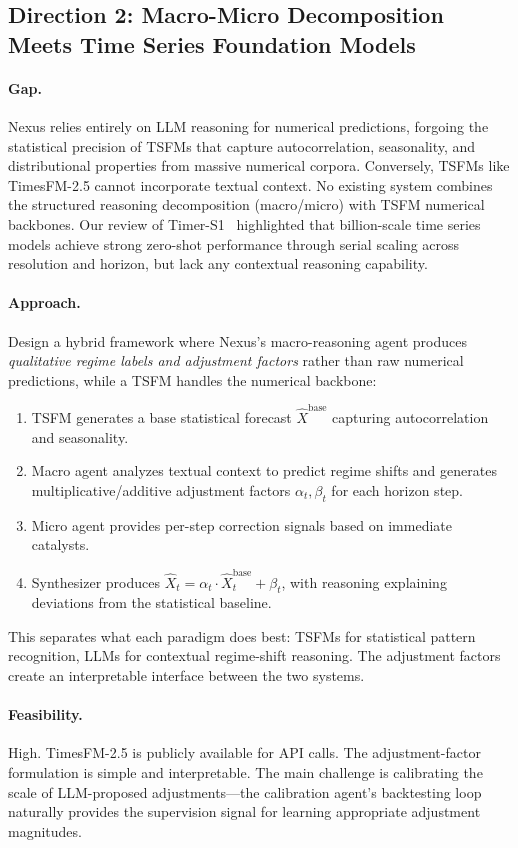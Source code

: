 \documentclass[11pt,a4paper]{article}
\begin{document}
\subsection{Direction 2: Macro-Micro Decomposition Meets Time Series Foundation Models}

\paragraph{Gap.} Nexus relies entirely on LLM reasoning for numerical predictions, forgoing the statistical precision of TSFMs that capture autocorrelation, seasonality, and distributional properties from massive numerical corpora. Conversely, TSFMs like TimesFM-2.5 cannot incorporate textual context. No existing system combines the structured reasoning decomposition (macro/micro) with TSFM numerical backbones. Our review of Timer-S1~\cite{timers1} highlighted that billion-scale time series models achieve strong zero-shot performance through serial scaling across resolution and horizon, but lack any contextual reasoning capability.

\paragraph{Approach.} Design a hybrid framework where Nexus's macro-reasoning agent produces \textit{qualitative regime labels and adjustment factors} rather than raw numerical predictions, while a TSFM handles the numerical backbone:
\begin{enumerate}[nosep]
\item TSFM generates a base statistical forecast $\hat{X}^{\mathrm{base}}$ capturing autocorrelation and seasonality.
\item Macro agent analyzes textual context to predict regime shifts and generates multiplicative/additive adjustment factors $\alpha_t, \beta_t$ for each horizon step.
\item Micro agent provides per-step correction signals based on immediate catalysts.
\item Synthesizer produces $\hat{X}_t = \alpha_t \cdot \hat{X}^{\mathrm{base}}_t + \beta_t$, with reasoning explaining deviations from the statistical baseline.
\end{enumerate}
This separates what each paradigm does best: TSFMs for statistical pattern recognition, LLMs for contextual regime-shift reasoning. The adjustment factors create an interpretable interface between the two systems.

\paragraph{Feasibility.} High. TimesFM-2.5 is publicly available for API calls. The adjustment-factor formulation is simple and interpretable. The main challenge is calibrating the scale of LLM-proposed adjustments---the calibration agent's backtesting loop naturally provides the supervision signal for learning appropriate adjustment magnitudes.
\end{document}
